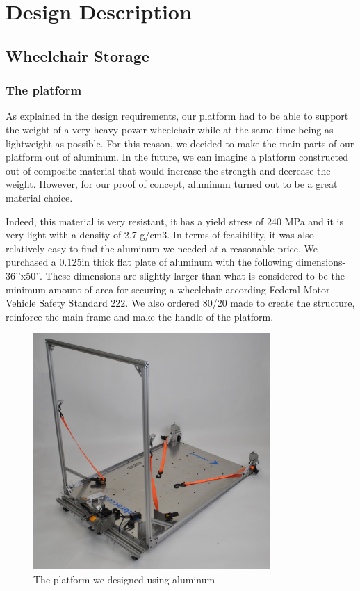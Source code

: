 \chapter{Design Description}

\section{Wheelchair Storage}

\subsection{The platform}

As explained in the design requirements, our platform had to be able to support the weight of a very heavy power wheelchair while at the same time being as lightweight as possible. For this reason, we decided to make the main parts of our platform out of aluminum. In the future, we can imagine a platform constructed out of composite material that would increase the strength and decrease the weight. However, for our proof of concept, aluminum turned out to be a great material choice. 
 
Indeed, this material is very resistant, it has a yield stress of 240 MPa and it is very light with a density of 2.7 g/cm3. In terms of feasibility, it was also relatively easy to find the aluminum we needed at a reasonable price. We purchased a 0.125in thick flat plate of aluminum with the following dimensions- 36’’x50’’. These dimensions are slightly larger than what is considered to be the minimum amount of area for securing a wheelchair according Federal Motor Vehicle Safety Standard 222. We also ordered 80/20 made to create the structure, reinforce the main frame and make the handle of the platform.
 
\begin{figure}[h]
\centering
\includegraphics[width=9cm]{images/platform1.jpg}
\caption{The platform we designed using aluminum}
\label{fig:platform1}
\end{figure}
 
